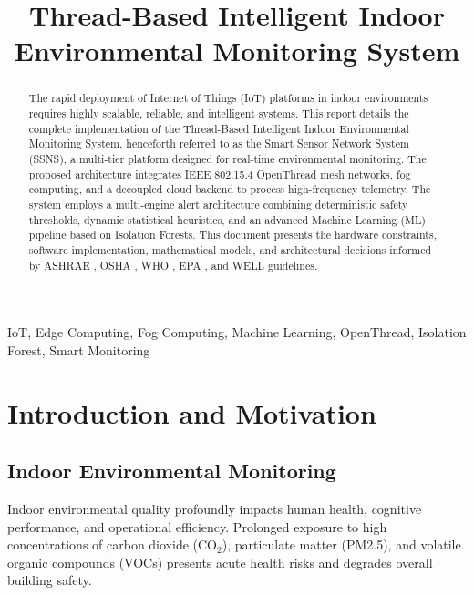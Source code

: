 \documentclass[conference]{IEEEtran}
\begin{document}
\title{Thread-Based Intelligent Indoor Environmental Monitoring System}

\author{
}

\maketitle

\begin{abstract}
The rapid deployment of Internet of Things (IoT) platforms in indoor environments requires highly scalable, reliable, and intelligent systems. This report details the complete implementation of the Thread-Based Intelligent Indoor Environmental Monitoring System, henceforth referred to as the Smart Sensor Network System (SSNS), a multi-tier platform designed for real-time environmental monitoring. The proposed architecture integrates IEEE 802.15.4 OpenThread mesh networks, fog computing, and a decoupled cloud backend to process high-frequency telemetry. The system employs a multi-engine alert architecture combining deterministic safety thresholds, dynamic statistical heuristics, and an advanced Machine Learning (ML) pipeline based on Isolation Forests. This document presents the hardware constraints, software implementation, mathematical models, and architectural decisions informed by ASHRAE \cite{b1,b15}, OSHA \cite{b14}, WHO \cite{b3}, EPA \cite{b4}, and WELL \cite{b5} guidelines.
\end{abstract}

\begin{IEEEkeywords}
IoT, Edge Computing, Fog Computing, Machine Learning, OpenThread, Isolation Forest, Smart Monitoring
\end{IEEEkeywords}

\tableofcontents
\listoffigures
\listoftables

\section{Introduction and Motivation}
\subsection{Indoor Environmental Monitoring}
Indoor environmental quality profoundly impacts human health, cognitive performance, and operational efficiency. Prolonged exposure to high concentrations of carbon dioxide (CO$_2$), particulate matter (PM2.5), and volatile organic compounds (VOCs) presents acute health risks and degrades overall building safety.
\end{document}
